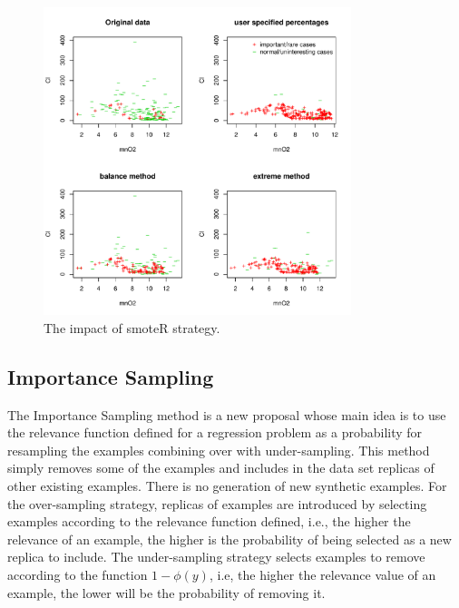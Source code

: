 \documentclass[10pt,a4paper]{article}\usepackage[]{graphicx}\usepackage[]{color}
\newenvironment{knitrout}{}{} %
\begin{document}
\begin{knitrout}\footnotesize
{}\color{fgcolor}\begin{figure}

{\centering \includegraphics[width=0.8\textwidth]{figures/UBL-smoteR_fig2-1} 

}

\caption[The impact of smoteR strategy]{The impact of smoteR strategy.}\label{fig:smoteR_fig2}
\end{figure}


\end{knitrout}



\subsection{Importance Sampling}\label{sec:IS}

The Importance Sampling method is a new proposal whose main idea is to use the relevance function defined for a regression problem as a probability for resampling the examples combining over with under-sampling. This method simply removes some of the examples and includes in the data set replicas of other existing examples. There is no generation of new synthetic examples. For the over-sampling strategy, replicas of examples are introduced by selecting examples according to the relevance function defined, i.e., the higher the relevance of an example, the higher is the probability of being selected as a new replica to include. The under-sampling strategy selects examples to remove according to the function $1-\phi(y)$, i.e, the higher the relevance value of an example, the lower will be the probability of removing it.
\end{document}
